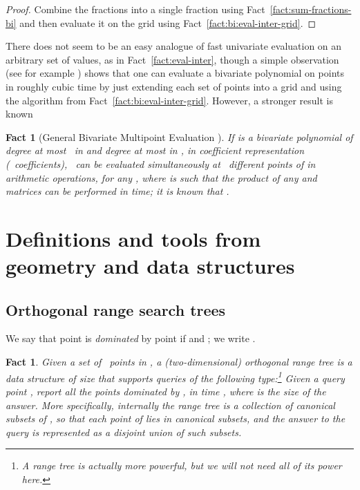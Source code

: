 \documentclass[11pt]{article}
\newtheorem{fact}[theorem]{Fact}
\theoremstyle{remark}
\begin{document}
\begin{proof}
  Combine the fractions into a single fraction using
  Fact~\ref{fact:sum-fractions-bi} and then evaluate it on the grid
   using Fact~\ref{fact:bi:eval-inter-grid}.
\end{proof}

There does not seem to be an easy analogue of fast univariate
evaluation on an arbitrary set of values, as in
Fact~\ref{fact:eval-inter}, though a simple observation (see for
example \cite{nz-fmebp-04}) shows that one can evaluate a
bivariate polynomial on  points in roughly cubic time by just
extending each set of  points into a grid and using the algorithm
from Fact~\ref{fact:bi:eval-inter-grid}.  However, a stronger result is known




\begin{fact}[General Bivariate Multipoint Evaluation \cite{nz-fmebp-04}]
  \label{fact:bi:general-eval}
  If  is a bivariate polynomial of degree at most~ in 
  and degree at most  in , in coefficient representation
  (~coefficients), ~can be evaluated simultaneously at
  ~different points of  in  arithmetic operations, for any ,
  where  is such that the product of any  and  matrices can be performed in  time; it is
  known that .
\end{fact}



\section{Definitions and tools from geometry and data structures}
\label{sec:def-ds-geom}

\subsection{Orthogonal range search trees}
\label{sec:ortho}



We say that point  is \emph{dominated} by point  if  and ; we write .

\begin{fact}
  Given a set  of ~points in , a
  \emph{(two-dimensional) orthogonal range tree} is a data structure of size  that supports queries of the following type:\footnote{A range tree is actually more powerful, but we will not need all
    of its power here.}  Given a query point , report all the
  points  dominated by , in time , where 
  is the size of the answer.  More specifically, internally the range
  tree is a collection of  \emph{canonical subsets} of , so
  that each point of  lies in  canonical subsets, and
  the answer to the query  is represented as a disjoint union of
   such subsets.
\end{fact}
\end{document}
